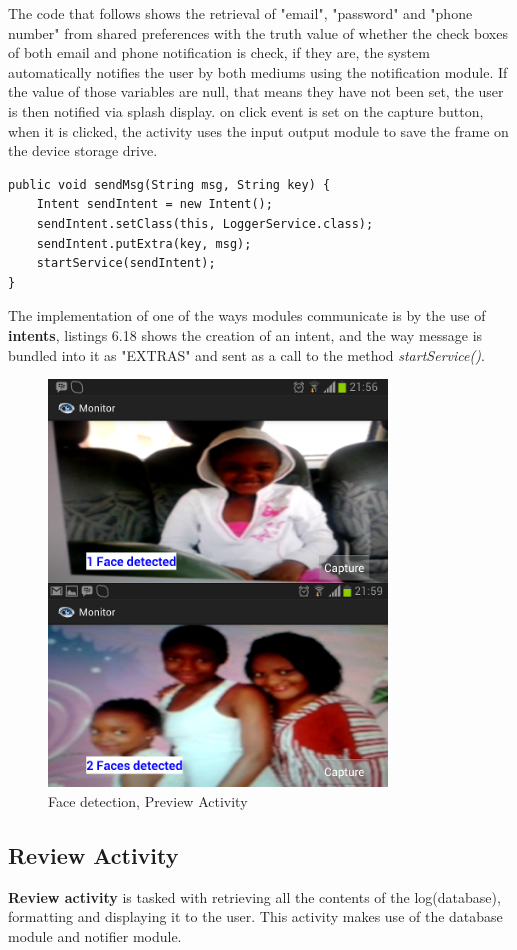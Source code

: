 The code that follows shows the retrieval of "email", "password" and "phone number" from shared preferences with the truth value of whether the check boxes of both email and phone notification is check, if they are, the system automatically notifies the user by both mediums using the notification module. If the value of those variables are null, that means they have not been set, the user is then notified via splash display. on click event is set on the capture button, when it is clicked, the activity uses the input output module to save the frame on the device storage drive.

\begin{lstlisting}[label=send-intent,caption=Medium to which preview activity sends messages to Logger Module]
public void sendMsg(String msg, String key) {
	Intent sendIntent = new Intent();
	sendIntent.setClass(this, LoggerService.class);
	sendIntent.putExtra(key, msg);
	startService(sendIntent);
}
\end{lstlisting} 	

The implementation of one of the ways modules communicate is by the use of {\bf intents}, listings 6.18 shows the creation of an intent, and the way message is bundled into it as "EXTRAS" and sent as a call to the method {\it startService()}.

\begin{figure}[ht!]
\centering
\includegraphics[width=90mm]{preview.png}
\caption{Face detection, Preview Activity}
\label{overflow}
\end{figure}    
\newpage
\subsection{Review Activity}
{\bf Review activity} is tasked with retrieving all the contents of the log(database), formatting and displaying it to the user. This activity makes use of the database module and notifier module. 

